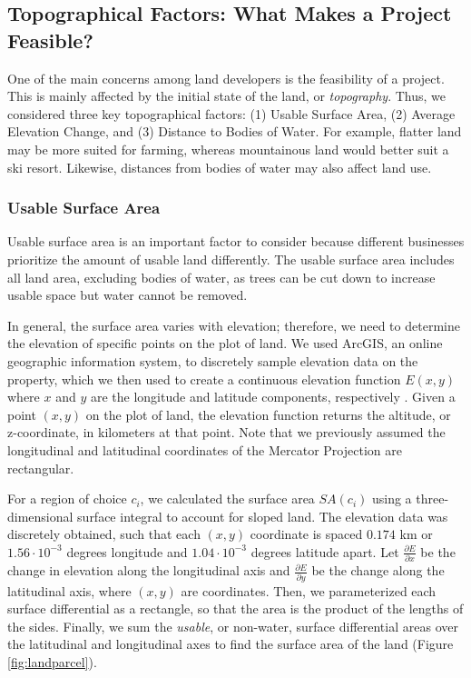 \documentclass{mcmthesis}
\begin{document}
\subsection{Topographical Factors: What Makes a Project Feasible?}

One of the main concerns among land developers is the feasibility of a project. This is mainly affected by the initial state of the land, or \textit{topography}. Thus, we considered three key topographical factors: (1) Usable Surface Area, (2) Average Elevation Change, and (3) Distance to Bodies of Water. For example, flatter land may be more suited for farming, whereas mountainous land would better suit a ski resort. Likewise, distances from bodies of water may also affect land use. 

\subsubsection{Usable Surface Area}

Usable surface area is an important factor to consider because different businesses prioritize the amount of usable land differently. The usable surface area includes all land area, excluding bodies of water, as trees can be cut down to increase usable space but water cannot be removed.

In general, the surface area varies with elevation; therefore, we need to determine the elevation of specific points on the plot of land. We used ArcGIS, an online geographic information system, to discretely sample elevation data on the property, which we then used to create a continuous elevation function $E(x, y)$ where $x$ and $y$ are the longitude and latitude components, respectively \cite{esri_arcgis_nodate}. Given a point $(x, y)$ on the plot of land, the elevation function returns the altitude, or z-coordinate, in kilometers at that point. Note that we previously assumed the longitudinal and latitudinal coordinates of the Mercator Projection are rectangular.

For a region of choice $c_i$, we calculated the surface area $SA(c_i)$ using a three-dimensional surface integral to account for sloped land. The elevation data was discretely obtained, such that each $(x, y)$ coordinate is spaced $0.174$ km or $1.56 \cdot 10^{-3}$ degrees longitude and $1.04 \cdot 10^{-3}$ degrees latitude apart. Let $\frac{\partial E}{\partial x}$ be the change in elevation along the longitudinal axis and $\frac{\partial E}{\partial y}$ be the change along the latitudinal axis, where $(x, y)$ are coordinates. Then, we parameterized each surface differential as a rectangle, so that the area is the product of the lengths of the sides. Finally, we sum the \textit{usable}, or non-water, surface differential areas over the latitudinal and longitudinal axes to find the surface area of the land (Figure \ref{fig:landparcel}). 
\end{document}
